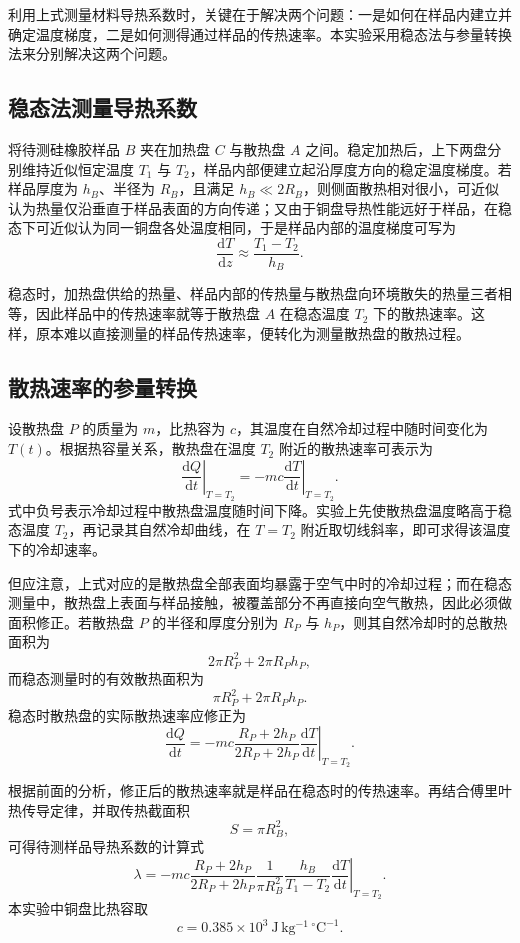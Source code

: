 \documentclass{../template/myrpt}
\begin{document}
利用上式测量材料导热系数时，关键在于解决两个问题：一是如何在样品内建立并确定温度梯度，二是如何测得通过样品的传热速率。本实验采用稳态法与参量转换法来分别解决这两个问题。

\subsection{稳态法测量导热系数}
将待测硅橡胶样品 $B$ 夹在加热盘 $C$ 与散热盘 $A$ 之间。稳定加热后，上下两盘分别维持近似恒定温度 $T_1$ 与 $T_2$，样品内部便建立起沿厚度方向的稳定温度梯度。若样品厚度为 $h_B$、半径为 $R_B$，且满足 $h_B \ll 2R_B$，则侧面散热相对很小，可近似认为热量仅沿垂直于样品表面的方向传递；又由于铜盘导热性能远好于样品，在稳态下可近似认为同一铜盘各处温度相同，于是样品内部的温度梯度可写为
\[
  \frac{\mathrm{d}T}{\mathrm{d}z}
  \approx
  \frac{T_1 - T_2}{h_B}.
\]

稳态时，加热盘供给的热量、样品内部的传热量与散热盘向环境散失的热量三者相等，因此样品中的传热速率就等于散热盘 $A$ 在稳态温度 $T_2$ 下的散热速率。这样，原本难以直接测量的样品传热速率，便转化为测量散热盘的散热过程。

\subsection{散热速率的参量转换}
设散热盘 $P$ 的质量为 $m$，比热容为 $c$，其温度在自然冷却过程中随时间变化为 $T(t)$。根据热容量关系，散热盘在温度 $T_2$ 附近的散热速率可表示为
\[
  \left.\frac{\mathrm{d}Q}{\mathrm{d}t}\right|_{T=T_2}
  =
  -mc
  \left.\frac{\mathrm{d}T}{\mathrm{d}t}\right|_{T=T_2}.
\]
式中负号表示冷却过程中散热盘温度随时间下降。实验上先使散热盘温度略高于稳态温度 $T_2$，再记录其自然冷却曲线，在 $T=T_2$ 附近取切线斜率，即可求得该温度下的冷却速率。

但应注意，上式对应的是散热盘全部表面均暴露于空气中时的冷却过程；而在稳态测量中，散热盘上表面与样品接触，被覆盖部分不再直接向空气散热，因此必须做面积修正。若散热盘 $P$ 的半径和厚度分别为 $R_P$ 与 $h_P$，则其自然冷却时的总散热面积为
\[
  2\pi R_P^2 + 2\pi R_P h_P,
\]
而稳态测量时的有效散热面积为
\[
  \pi R_P^2 + 2\pi R_P h_P.
\]
稳态时散热盘的实际散热速率应修正为
\[
  \frac{\mathrm{d}Q}{\mathrm{d}t}
  =
  -mc
  \frac{R_P + 2h_P}{2R_P + 2h_P}
  \left.\frac{\mathrm{d}T}{\mathrm{d}t}\right|_{T=T_2}.
\]

根据前面的分析，修正后的散热速率就是样品在稳态时的传热速率。再结合傅里叶热传导定律，并取传热截面积
\[
  S=\pi R_B^2,
\]
可得待测样品导热系数的计算式
\[
  \lambda
  =
  -mc
  \frac{R_P + 2h_P}{2R_P + 2h_P}
  \frac{1}{\pi R_B^2}
  \frac{h_B}{T_1 - T_2}
  \left.\frac{\mathrm{d}T}{\mathrm{d}t}\right|_{T=T_2}.
\]
本实验中铜盘比热容取
\[
  c = 0.385 \times 10^3\ \mathrm{J\,kg^{-1}\,^{\circ}C^{-1}}.
\]
\end{document}
